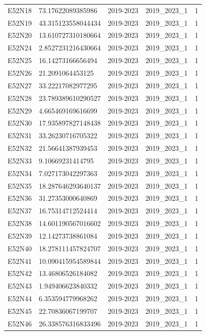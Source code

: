 \begin{landscape}
\begin{longtable}{lllll}
E52N18 & 73.17622089385986 & 2019-2023 & 2019\_2023\_1 & 1 \\
E52N19 & 43.315123558044434 & 2019-2023 & 2019\_2023\_1 & 1 \\
E52N20 & 13.610727310180664 & 2019-2023 & 2019\_2023\_1 & 1 \\
E52N24 & 2.8527231216430664 & 2019-2023 & 2019\_2023\_1 & 1 \\
E52N25 & 16.14273166656494 & 2019-2023 & 2019\_2023\_1 & 1 \\
E52N26 & 21.2091064453125 & 2019-2023 & 2019\_2023\_1 & 1 \\
E52N27 & 33.22217082977295 & 2019-2023 & 2019\_2023\_1 & 1 \\
E52N28 & 23.789389610290527 & 2019-2023 & 2019\_2023\_1 & 1 \\
E52N29 & 4.665469169616699 & 2019-2023 & 2019\_2023\_1 & 1 \\
E52N30 & 17.935897827148438 & 2019-2023 & 2019\_2023\_1 & 1 \\
E52N31 & 33.26230716705322 & 2019-2023 & 2019\_2023\_1 & 1 \\
E52N32 & 21.56641387939453 & 2019-2023 & 2019\_2023\_1 & 1 \\
E52N33 & 9.10669231414795 & 2019-2023 & 2019\_2023\_1 & 1 \\
E52N34 & 7.027173042297363 & 2019-2023 & 2019\_2023\_1 & 1 \\
E52N35 & 18.287646293640137 & 2019-2023 & 2019\_2023\_1 & 1 \\
E52N36 & 31.27353000640869 & 2019-2023 & 2019\_2023\_1 & 1 \\
E52N37 & 16.75314712524414 & 2019-2023 & 2019\_2023\_1 & 1 \\
E52N38 & 14.601190567016602 & 2019-2023 & 2019\_2023\_1 & 1 \\
E52N39 & 12.14273738861084 & 2019-2023 & 2019\_2023\_1 & 1 \\
E52N40 & 18.278111457824707 & 2019-2023 & 2019\_2023\_1 & 1 \\
E52N41 & 10.090415954589844 & 2019-2023 & 2019\_2023\_1 & 1 \\
E52N42 & 13.46806526184082 & 2019-2023 & 2019\_2023\_1 & 1 \\
E52N43 & 1.949406623840332 & 2019-2023 & 2019\_2023\_1 & 1 \\
E52N44 & 6.353594779968262 & 2019-2023 & 2019\_2023\_1 & 1 \\
E52N45 & 22.70836067199707 & 2019-2023 & 2019\_2023\_1 & 1 \\
E52N46 & 26.338576316833496 & 2019-2023 & 2019\_2023\_1 & 1 \\

\end{longtable}
\end{landscape}
